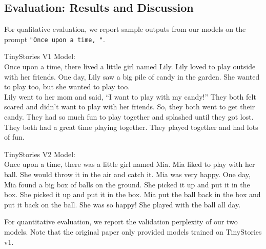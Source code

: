 \documentclass[../main.tex]{subfiles}
\begin{document}
\subsection{Evaluation: Results and Discussion}
For qualitative evaluation, we report sample outputs from our models on the prompt \verb|"Once upon a time, "|.

\begin{minipage}[t]{0.48\textwidth}
TinyStories V1 Model: \\
{\small Once upon a time, there lived a little girl named Lily. Lily loved to play outside with her friends. One day, Lily saw a big pile of candy in the garden. She wanted to play too, but she wanted to play too. \\ Lily went to her mom and said, ``I want to play with my candy!'' They both felt scared and didn't want to play with her friends. So, they both went to get their candy. They had so much fun to play together and splashed until they got lost. They both had a great time playing together. They played together and had lots of fun.}
\end{minipage}
\hfill
\begin{minipage}[t]{0.48\textwidth}
TinyStories V2 Model: \\ 
{\small Once upon a time, there was a little girl named Mia. Mia liked to play with her ball. She would throw it in the air and catch it. Mia was very happy. One day, Mia found a big box of balls on the ground. She picked it up and put it in the box. She picked it up and put it in the box. Mia put the ball back in the box and put it back on the ball. She was so happy! She played with the ball all day.}
\end{minipage}

\vspace{2em}

For quantitative evaluation, we report the validation perplexity of our two models. Note that the original paper only provided models trained on TinyStories v1.
\end{document}
